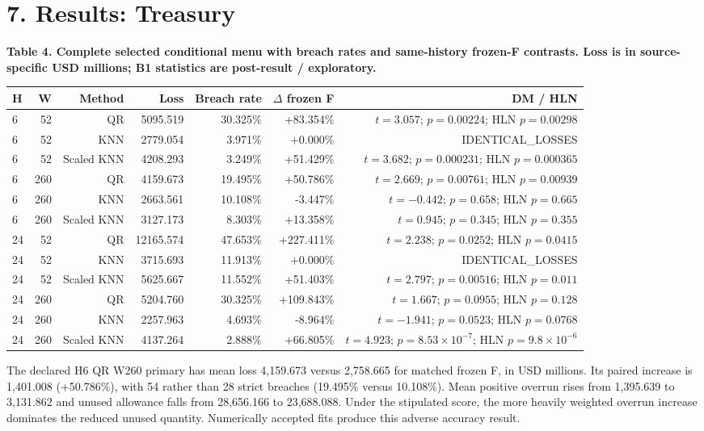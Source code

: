 \documentclass[10pt,a4paper]{article}
\begin{document}
\section*{7. Results: Treasury}
\begin{center}
\begin{minipage}{\linewidth}
\small\textbf{Table 4. Complete selected conditional menu with breach rates and same-history frozen-F contrasts. Loss is in source-specific USD millions; B1 statistics are post-result / exploratory.}\par\medskip
\centering\fontsize{8}{10}\selectfont
\begin{tabular}{lrrrrrr}
\toprule
H & W & Method & Loss & Breach rate & \(\Delta\) frozen F & DM / HLN \\
\midrule
6 & 52 & QR & 5095.519 & 30.325\% & +83.354\% & \(t=3.057\); \(p=0.00224\); HLN \(p=0.00298\) \\
6 & 52 & KNN & 2779.054 & 3.971\% & +0.000\% & IDENTICAL\_LOSSES \\
6 & 52 & Scaled KNN & 4208.293 & 3.249\% & +51.429\% & \(t=3.682\); \(p=0.000231\); HLN \(p=0.000365\) \\
6 & 260 & QR & 4159.673 & 19.495\% & +50.786\% & \(t=2.669\); \(p=0.00761\); HLN \(p=0.00939\) \\
6 & 260 & KNN & 2663.561 & 10.108\% & -3.447\% & \(t=-0.442\); \(p=0.658\); HLN \(p=0.665\) \\
6 & 260 & Scaled KNN & 3127.173 & 8.303\% & +13.358\% & \(t=0.945\); \(p=0.345\); HLN \(p=0.355\) \\
24 & 52 & QR & 12165.574 & 47.653\% & +227.411\% & \(t=2.238\); \(p=0.0252\); HLN \(p=0.0415\) \\
24 & 52 & KNN & 3715.693 & 11.913\% & +0.000\% & IDENTICAL\_LOSSES \\
24 & 52 & Scaled KNN & 5625.667 & 11.552\% & +51.403\% & \(t=2.797\); \(p=0.00516\); HLN \(p=0.011\) \\
24 & 260 & QR & 5204.760 & 30.325\% & +109.843\% & \(t=1.667\); \(p=0.0955\); HLN \(p=0.128\) \\
24 & 260 & KNN & 2257.963 & 4.693\% & -8.964\% & \(t=-1.941\); \(p=0.0523\); HLN \(p=0.0768\) \\
24 & 260 & Scaled KNN & 4137.264 & 2.888\% & +66.805\% & \(t=4.923\); \(p=8.53\times10^{-7}\); HLN \(p=9.8\times10^{-6}\) \\
\bottomrule
\end{tabular}
\end{minipage}
\end{center}
The declared H6 QR W260 primary has mean loss 4,159.673 versus 2,758.665 for matched frozen F, in USD millions. Its paired increase is 1,401.008 (+50.786\%), with 54 rather than 28 strict breaches (19.495\% versus 10.108\%). Mean positive overrun rises from 1,395.639 to 3,131.862 and unused allowance falls from 28,656.166 to 23,688.088. Under the stipulated score, the more heavily weighted overrun increase dominates the reduced unused quantity. Numerically accepted fits produce this adverse accuracy result.
\end{document}
